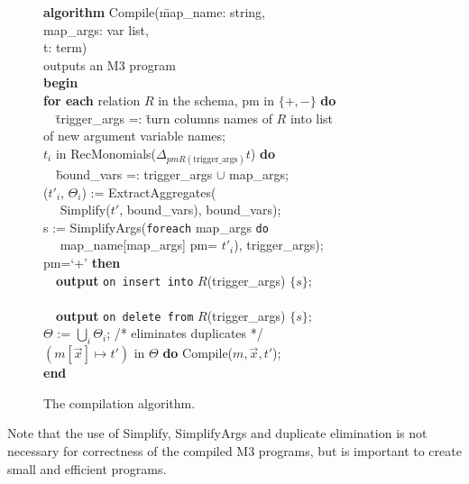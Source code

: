 \begin{figure}
\begin{tabbing}
{\bf algorithm} Compile(\=map\_name: string, \\
                  \>map\_args: var list, \\
                  \>t: term) \\
outputs an M3 program \\
{\bf begin} \\
{\bf for each} relation $R$ in the schema,
               pm in $\{+,-\}$ {\bf do} \\
~~\=
  trigger\_args =: \=turn columns names of $R$ into list \\
\>               \>of new argument variable names; \\
 $t_i$ in
        RecMonomials($\Delta_{pm R(\mathrm{trigger\_args})} t$) {\bf do} \\
\>~~\=bound\_vars =: trigger\_args $\cup$ map\_args; \\
\>\>($t'_i$, $\Theta_i$) := ExtractAggregates( \\
\>\>~~      Simplify($t'$, bound\_vars), bound\_vars); \\
\>\>s := SimplifyArgs({\tt foreach} map\_args {\tt do} \\
\>\>~~       map\_name[map\_args] pm= $t'_i$), trigger\_args); \\[1ex]
\> pm=`+' {\bf then} \\
\>\>~~{\bf output} {\tt on insert into} $R$(trigger\_args) $\{s\}$; \\
\> \\
\>\>~~{\bf output} {\tt on delete from} $R$(trigger\_args) $\{s\}$; \\[1ex]
\>$\Theta$ := $\bigcup_i \Theta_i$; /* eliminates duplicates */ \\
 $(m[\vec{x}] \mapsto t')$ in $\Theta$ {\bf do}
                 Compile($m, \vec{x}, t'$); \\
{\bf end}
\end{tabbing}

\vspace{-6mm}

\caption{The compilation algorithm.}
\label{fig:compilation-algo}
\end{figure}


Note that the use of Simplify, SimplifyArgs and duplicate elimination
is not necessary for correctness of the compiled M3 programs, but is important
to create small and efficient programs.



